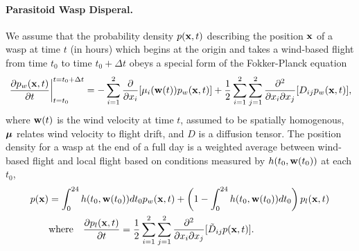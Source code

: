 \documentclass[11pt]{article}
\begin{document}
\paragraph{Parasitoid Wasp Disperal.} We assume that the probability density $p(\mathbf{x},t)$ describing the position $\mathbf{x}$ of a wasp at time $t$ (in hours) which begins at the origin and takes a wind-based flight from time $t_0$ to time $t_0+\Delta t$ obeys a special form of the Fokker-Planck equation
\begin{equation}
\left.\frac{\partial p_w(\mathbf{x},t)}{\partial t}\right|_{t=t_0}^{t=t_0+\Delta t} = -\sum_{i=1}^2\frac{\partial}{\partial x_i}[\mu_i(\mathbf{w}(t))p_w(\mathbf{x},t)] + \frac{1}{2}\sum_{i=1}^2\sum_{j=1}^2 \frac{\partial^2}{\partial x_i\partial x_j}[D_{ij}p_w(\mathbf{x},t)],\label{eqn:FP}
\end{equation}
where $\mathbf{w}(t)$ is the wind velocity at time $t$, assumed to be spatially homogenous, $\boldsymbol\mu$ relates wind velocity to flight drift, and $D$ is a diffusion tensor. The position density for a wasp at the end of a full day is a weighted average between wind-based flight and local flight based on conditions measured by $h(t_0,\mathbf{w}(t_0))$ at each $t_0$,
\begin{align}
p(\mathbf{x}) &= \int_0^{24}h(t_0,\mathbf{w}(t_0))dt_0p_w(\mathbf{x},t) + \left(1-\int_0^{24}h(t_0,\mathbf{w}(t_0))dt_0\right)p_l(\mathbf{x},t)\label{eqn:sum}\\
&\mbox{where}\ \ \ \frac{\partial p_l(\mathbf{x},t)}{\partial t} = \frac{1}{2}\sum_{i=1}^2\sum_{j=1}^2 \frac{\partial^2}{\partial x_i\partial x_j}[\tilde{D}_{ij}p(\mathbf{x},t)].\nonumber
\end{align}
\end{document}
